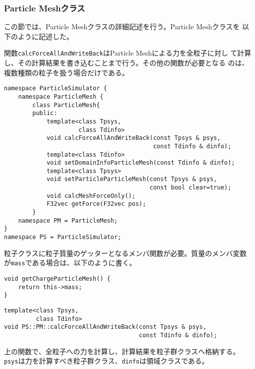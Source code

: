 \subsubsection{Particle Meshクラス}
\label{sec:detail_option_particle_mesh}

この節では、Particle Meshクラスの詳細記述を行う。Particle Meshクラスを
以下のように記述した。

関数{\tt calcForceAllAndWriteBack}はParticle Meshによる力を全粒子に対し
て計算し、その計算結果を書き込むことまで行う。その他の関数が必要となる
のは、複数種類の粒子を扱う場合だけである。

\begin{lstlisting}[caption=ParticleMesh]
namespace ParticleSimulator {
    namespace ParticleMesh {
        class ParticleMesh{
        public:
            template<class Tpsys,
                     class Tdinfo>
            void calcForceAllAndWriteBack(const Tpsys & psys,
                                          const Tdinfo & dinfo);
            template<class Tdinfo>
            void setDomainInfoParticleMesh(const Tdinfo & dinfo);
            template<class Tpsys>
            void setParticleParticleMesh(const Tpsys & psys,
                                         const bool clear=true); 
            void calcMeshForceOnly();
            F32vec getForce(F32vec pos);
        }
    namespace PM = ParticleMesh;
}
namespace PS = ParticleSimulator;
\end{lstlisting}

粒子クラスに粒子質量のゲッターとなるメンバ関数が必要。質量のメンバ変数
が{\tt mass}である場合は、以下のように書く。
\begin{screen}
\begin{verbatim}
void getChargeParticleMesh() {
    return this->mass;
}
\end{verbatim}
\end{screen}


\begin{screen}
\begin{verbatim}
template<class Tpsys,
         class Tdinfo>
void PS::PM::calcForceAllAndWriteBack(const Tpsys & psys,
                                      const Tdinfo & dinfo);
\end{verbatim}
\end{screen}

上の関数で、全粒子への力を計算し、計算結果を粒子群クラスへ格納する。
{\tt psys}は力を計算すべき粒子群クラス、{\tt dinfo}は領域クラスである。

